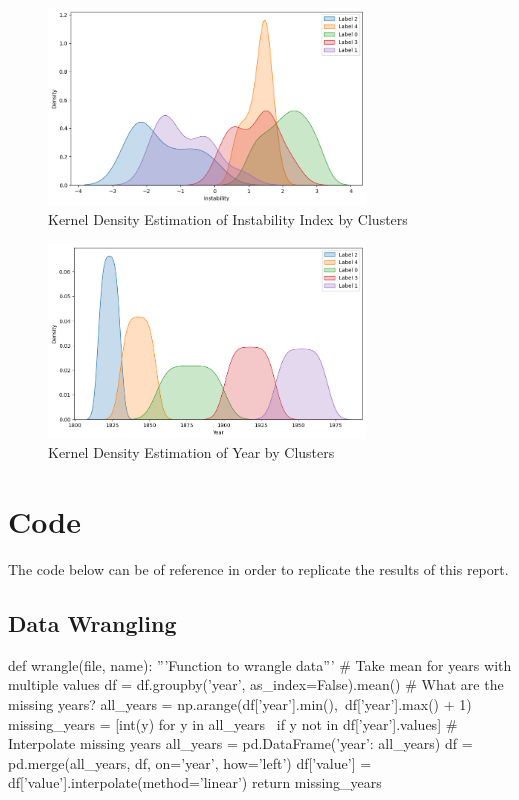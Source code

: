 \documentclass[twocolumn]{article}
\begin{document}
\begin{appendices}
\begin{figure}[h!]
    \includegraphics[width=0.75\textwidth]{images/kde_instab.png}
    \caption{Kernel Density Estimation of Instability Index by Clusters}
    \label{kde_instab}
\end{figure}
\FloatBarrier
\begin{figure}[h!]
    \centering
    \includegraphics[width=0.75\textwidth]{images/kde_year.png}
    \caption{Kernel Density Estimation of Year by Clusters}
    \label{kde_year}
\end{figure}
\FloatBarrier
\newpage

\section{Code}
The code below can be of reference in order to replicate the results of this report.
\subsection{Data Wrangling}
\begin{python}
def wrangle(file, name):
    '''Function to wrangle data'''
    # Take mean for years with multiple values
    df = df.groupby('year', as_index=False).mean()
    # What are the missing years?
    all_years = np.arange(df['year'].min(),\
    df['year'].max() + 1)
    missing_years = [int(y) for y in all_years \
    if y not in df['year'].values]
    # Interpolate missing years
    all_years = pd.DataFrame({'year': all_years})
    df = pd.merge(all_years, df, on='year', how='left')
    df['value'] = df['value'].interpolate(method='linear')
    return missing_years


\end{python}
\end{appendices}
\end{document}
